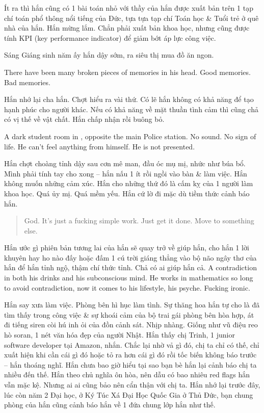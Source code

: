 \documentclass[12pt]{article}
\begin{document}
Ít ra thì hắn cũng có 1 bài toán nhỏ với thầy của hắn được xuất bản trên 1 tạp chí toán phổ thông nổi tiếng của Đức, tựa tựa tạp chí Toán học \& Tuổi trẻ ở quê nhà của hắn. Hắn mừng lắm. Chẳn phải xuất bản khoa học, nhưng cũng được tính KPI (key performance indicator) để giảm bớt áp lực công việc.

Sáng Giáng sinh năm ấy hắn dậy sớm, ra siêu thị mua đồ ăn ngon. 

There have been many broken pieces of memories in his head. Good memories. Bad memories.

Hắn nhớ lại cha hắn. Chợt hiểu ra vài thứ. Có lẽ hắn không có khả năng để tạo hạnh phúc cho người khác. Nếu có khả năng về mặt thuần tình cảm thì cũng chả có vị thế về vật chất. Hắn chấp nhận rồi buông bỏ.

A dark student room in , opposite the main Police station. No sound. No sign of life. He can't feel anything from himself. He is not presented.

Hắn chợt choàng tỉnh dậy sau cơn mê man, đầu óc mụ mị, nhức như búa bổ. Mình phải tính tay cho xong -- hắn nấu 1 ít rồi ngồi vào bàn \& làm việc. Hắn không muốn những cảm xúc. Hắn cho những thứ đó là cấm kỵ của 1 người làm khoa học. Quá ủy mị. Quá mềm yếu. Hắn cứ lờ đi mặc dù tiềm thức cảnh báo hắn.

\begin{quote}
	God. It's just a fucking simple work. Just get it done. Move to something else.
\end{quote}
Hắn ước gì phiên bản tương lai của hắn sẽ quay trở về giúp hắn, cho hắn 1 lời khuyên hay ho nào đấy hoặc đấm 1 cú trời giáng thẳng vào bộ não ngây thơ của hắn để hắn tỉnh ngộ, thậm chí thức tỉnh. Chả có ai giúp hắn cả. A contradiction in both his drinks and his subconscious mind. He works in mathematics so long to avoid contradiction, now it comes to his lifestyle, his psyche. Fucking ironic.

Hắn say xưa làm việc. Phòng bên hì hục làm tình. Sự thăng hoa hắn tự cho là đã tìm thấy trong công việc \& sự khoái cảm của bộ trai gái phòng bên hòa hợp, át đi tiếng siren còi hú inh ỏi của đồn cảnh sát. Nhịp nhàng. Giống như vũ điệu reo hò soran, 1 nét văn hóa đẹp của người Nhật. Hắn thấy chị Trinh, 1 junior software developer tại Amazon, nhắn. Chắc lại nhờ vả gì đó, chị ta chỉ có thế, chỉ xuất hiện khi cần cái gì đó hoặc tỏ ra hơn cái gì đó rồi tốc biến không báo trước -- hắn thoáng nghĩ. Hắn chưa bao giờ hiểu tại sao bạn bè hắn lại cảnh báo chị ta nhiều đến thế. Hắn theo chủ nghĩa ôn hòa, nên dẫu có bao nhiêu red flags hắn vẫn mặc kệ. Nhưng ai ai cũng bảo nên cẩn thận với chị ta. Hắn nhớ lại trước đây, lúc còn năm 2 Đại học, ở Ký Túc Xá Đại Học Quốc Gia ở Thủ Đức, bạn chung phòng của hắn cũng cảnh báo hắn về 1 đứa chung lớp hắn như thế.
\end{document}
